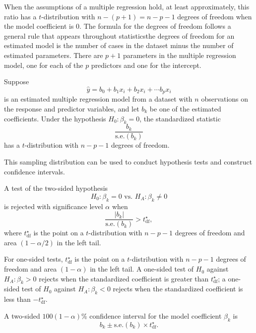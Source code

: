 When the assumptions of a multiple regression hold, at least approximately, this ratio has a $t$-distribution with $n - (p + 1) =n - p - 1$ degrees of freedom when the model coefficient is 0. The formula for the degrees of freedom follows a general rule that appears throughout statistics\textemdash the degrees of freedom for an estimated model is the number of cases in the dataset minus the number of estimated parameters.  There are $p + 1$ parameters in the multiple regression model, one for each of the $p$ predictors and one for the intercept.

\begin{termBox}{
Suppose 
\[
\hat{y} = b_0 + b_1 x_{i} + b_2 x_{i} +\cdots b_p x_{i}
\]
is an estimated multiple regression model from a dataset with $n$ observations on the response and predictor variables, and let $b_k$ be one of the estimated coefficients.  Under the hypothesis $H_0: \beta_k = 0$, the standardized statistic
\[
      \frac{b_k}{\textrm{s.e.}(b_k)}
\]
has a $t$-distribution with $n - p - 1$ degrees of freedom.}
\end{termBox}

This sampling distribution can be used to conduct hypothesis tests and construct confidence intervals.

\begin{termBox}{
A test of the two-sided hypothesis
\[
  H_0: \beta_k = 0 \text{ vs. } H_A: \beta_k \ne 0
\]
is rejected with significance level $\alpha$ when 
\[
     \frac{|b_k|}{\textrm{s.e.}(b_k)} > t_{\text{df}}^\star,
\]
where $t_{\text{df}}^\star$ is the point on a $t$-distribution with $n - p - 1$ degrees of freedom and area $(1 - \alpha/2)$ in the left tail.}
\end{termBox}

For one-sided tests, $t_{\text{df}}^\star$ is the point on a $t$-distribution with $n - p - 1$ degrees of freedom and area $(1 - \alpha)$ in the left tail. A one-sided test of $H_0$ against $H_A: \beta_k > 0$ rejects when the standardized coefficient is greater than  $ t_{\text{df}}^\star$; a one-sided test of $H_0$ against $H_A: \beta_k < 0$  rejects when the standardized coefficient is less than $-t_{\text{df}}^\star$. 

\begin{termBox}{
A two-sided $100(1 - \alpha)$\% confidence interval for the model coefficient $\beta_k$ is 
\[
     b_k \pm {\textrm{s.e.}(b_k)} \times t_{\text{df}}^\star.
\]}
\end{termBox}


